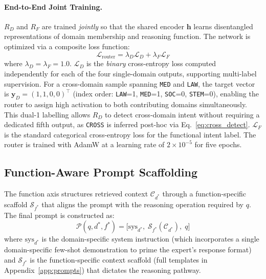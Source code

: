 \documentclass[a4paper,fleql]{cas-sc}
\begin{document}
\paragraph{End-to-End Joint Training.}
$R_D$ and $R_F$ are trained \emph{jointly} so that the shared encoder
$\mathbf{h}$ learns disentangled representations of domain membership and
reasoning function. The network is optimized via a composite loss function:
\begin{equation}
    \mathcal{L}_{\text{router}} = \lambda_D \mathcal{L}_{D}
    + \lambda_F \mathcal{L}_{F}
    \label{eq:joint_loss}
\end{equation}
where $\lambda_D = \lambda_F = 1.0$.
$\mathcal{L}_{D}$ is the \emph{binary} cross-entropy loss computed
independently for each of the four single-domain outputs, supporting
multi-label supervision. For a cross-domain sample spanning
\texttt{MED} and \texttt{LAW}, the target vector is
$\mathbf{y}_D = (1, 1, 0, 0)^\top$
(index order: \texttt{LAW}=1, \texttt{MED}=1, \texttt{SOC}=0,
\texttt{STEM}=0), enabling the router to assign high activation to both
contributing domains simultaneously. This dual-1 labelling allows
$R_D$ to detect cross-domain intent without requiring a dedicated
fifth output, as \texttt{CROSS} is inferred post-hoc via
Eq.~\ref{eq:cross_detect}.
$\mathcal{L}_{F}$ is the standard categorical cross-entropy loss for the
functional intent label. The router is trained with AdamW at a learning
rate of $2 \times 10^{-5}$ for five epochs.

\subsection{Function-Aware Prompt Scaffolding}
\label{ssec:functionaxis}
The function axis structures retrieved context $\mathcal{C}_{d^*}$ through
a function-specific scaffold $\mathcal{S}_{f^*}$ that aligns the prompt with
the reasoning operation required by $q$. The final prompt is constructed as:
\begin{equation}
    \mathcal{P}(q, d^*, f^*) = \big[ \text{sys}_{d^*},\;
    \mathcal{S}_{f^*}(\mathcal{C}_{d^*}),\; q \big]
    \label{eq:prompt}
\end{equation}
where $\text{sys}_{d^*}$ is the domain-specific system instruction
(which incorporates a single domain-specific few-shot demonstration to
prime the expert's response format) and $\mathcal{S}_{f^*}$ is the
function-specific context scaffold (full templates in
Appendix~\ref{app:prompts}) that dictates the reasoning pathway.
\end{document}
